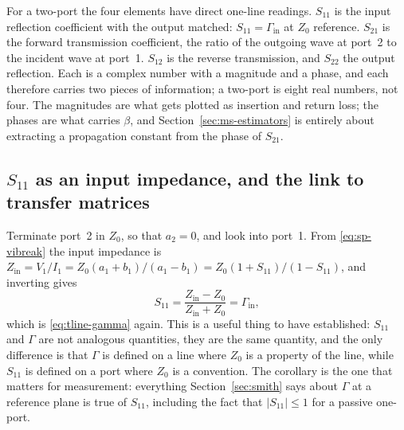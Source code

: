 For a two-port the four elements have direct one-line readings. $S_{11}$ is the input reflection coefficient with
the output matched: $S_{11}=\Gamma_{\mathrm{in}}$ at $Z_0$ reference. $S_{21}$ is the forward transmission
coefficient, the ratio of the outgoing wave at port~2 to the incident wave at port~1. $S_{12}$ is the reverse
transmission, and $S_{22}$ the output reflection. Each is a complex number with a magnitude and a phase, and each
therefore carries two pieces of information; a two-port is eight real numbers, not four. The magnitudes are what
gets plotted as insertion and return loss; the phases are what carries $\beta$, and Section~\ref{sec:ms-estimators}
is entirely about extracting a propagation constant from the phase of $S_{21}$.

\subsection{$S_{11}$ as an input impedance, and the link to transfer matrices}
\label{sec:sp-zin}

Terminate port~2 in $Z_0$, so that $a_2=0$, and look into port~1. From \eqref{eq:sp-vibreak} the input
impedance is $Z_{\mathrm{in}}=V_1/I_1=Z_0(a_1+b_1)/(a_1-b_1)=Z_0(1+S_{11})/(1-S_{11})$, and inverting gives
\begin{equation}
  S_{11} = \frac{Z_{\mathrm{in}}-Z_0}{Z_{\mathrm{in}}+Z_0} = \Gamma_{\mathrm{in}} ,
  \label{eq:sp-s11-gamma}
\end{equation}
which is \eqref{eq:tline-gamma} again. This is a useful thing to have established: $S_{11}$ and $\Gamma$ are not
analogous quantities, they are the same quantity, and the only difference is that $\Gamma$ is defined on a line
where $Z_0$ is a property of the line, while $S_{11}$ is defined on a port where $Z_0$ is a convention. The
corollary is the one that matters for measurement: everything Section~\ref{sec:smith} says about $\Gamma$ at a
reference plane is true of $S_{11}$, including the fact that $|S_{11}|\le1$ for a passive one-port.

